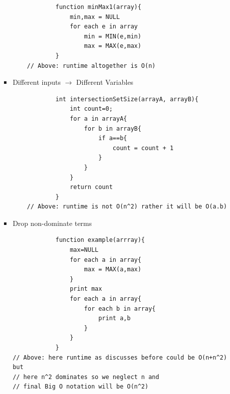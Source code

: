 \documentclass[11pt]{article}
\begin{document}
\begin{enumerate}
\begin{itemize}
\begin{itemize}
\begin{verbatim}
            function minMax1(array){
                min,max = NULL
                for each e in array
                    min = MIN(e,min)
                    max = MAX(e,max)
            }
    // Above: runtime altogether is O(n)
                \end{verbatim}
                \item Different inputs $\rightarrow$ Different Variables
                \begin{verbatim}
            int intersectionSetSize(arrayA, arrayB){
                int count=0;
                for a in arrayA{
                    for b in arrayB{
                        if a==b{
                            count = count + 1
                        }
                    }
                }
                return count
            }
    // Above: runtime is not O(n^2) rather it will be O(a.b)
                \end{verbatim}
                \item Drop non-dominate terms
                \begin{verbatim}
            function example(arrray){
                max=NULL
                for each a in array{
                    max = MAX(a,max)
                }
                print max
                for each a in array{
                    for each b in array{
                        print a,b
                    }
                }
            }
// Above: here runtime as discusses before could be O(n+n^2) but 
// here n^2 dominates so we neglect n and 
// final Big O notation will be O(n^2)
                \end{verbatim}
            \end{itemize}
        \end{itemize}
    \end{enumerate}
\end{document}
